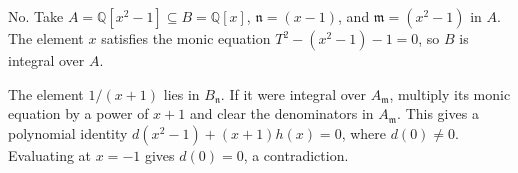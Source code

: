 No. Take $A=\mathbb{Q}[x^2-1]\subseteq B=\mathbb{Q}[x]$, $\mathfrak{n}=(x-1)$, and $\mathfrak{m}=(x^2-1)$ in $A$. The element $x$ satisfies the monic equation $T^2-(x^2-1)-1=0$, so $B$ is integral over $A$.

The element $1/(x+1)$ lies in $B_{\mathfrak{n}}$. If it were integral over $A_{\mathfrak{m}}$, multiply its monic equation by a power of $x+1$ and clear the denominators in $A_{\mathfrak{m}}$. This gives a polynomial identity $d(x^2-1)+(x+1)h(x)=0$, where $d(0)\neq0$. Evaluating at $x=-1$ gives $d(0)=0$, a contradiction.
